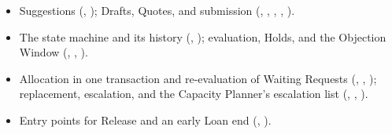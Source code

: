 \begin{itemize}
\item Suggestions (, ); Drafts, Quotes, and submission (, , , , ).
\item The state machine and its history (, ); evaluation, Holds, and the Objection Window (, , ).
\item Allocation in one transaction and re-evaluation of Waiting Requests (, , ); replacement, escalation, and the Capacity Planner's escalation list (, , ).
\item Entry points for Release and an early Loan end (, ).
\end{itemize}

